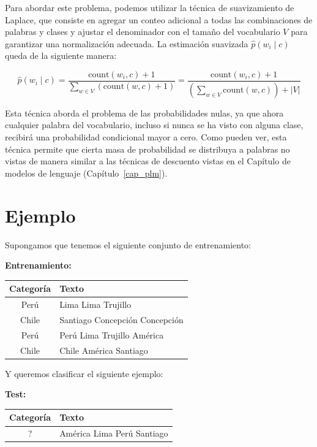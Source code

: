 \documentclass[11pt,fleqn]{book} %
\begin{document}
Para abordar este problema, podemos utilizar la técnica de suavizamiento de Laplace, que consiste en agregar un conteo adicional a todas las combinaciones de palabras y clases y ajustar el denominador con el tamaño del vocabulario $V$ para garantizar una normalización adecuada. La estimación suavizada $\hat{p}(w_i \mid c)$ queda de la siguiente manera:

\[
\hat{p}(w_i \mid c) = \frac{\text{count}(w_i, c) + 1}{\sum_{w \in V} (\text{count}(w, c) + 1)} = \frac{\text{count}(w_i, c) + 1}{(\sum_{w \in V} \text{count}(w, c))+|V|}
\]

Esta técnica aborda el problema de las probabilidades nulas, ya que ahora cualquier palabra del vocabulario, incluso si nunca se ha visto con alguna clase, recibirá una probabilidad condicional mayor a cero. Como pueden ver, esta técnica permite que cierta masa de probabilidad se distribuya a palabras no vistas de manera similar a  las técnicas de descuento vistas en el Capítulo de modelos de lenguaje (Capítulo~\ref{cap_plm}).








\section{Ejemplo}

Supongamos que tenemos el siguiente conjunto de entrenamiento:

\textbf{Entrenamiento:}
\begin{table}[h]
\centering
\begin{tabular}{|c|p{}|}
\hline
\textbf{Categoría} & \textbf{Texto} \\
\hline
Perú & Lima Lima Trujillo \\
\hline
Chile & Santiago Concepción Concepción\\
\hline
Perú & Perú Lima Trujillo América\\
\hline
Chile & Chile América Santiago \\
\hline
\end{tabular}
\end{table}

Y queremos clasificar el siguiente ejemplo:

\textbf{Test:}
\begin{table}[h]
\centering
\begin{tabular}{|c|p{}|}
\hline
\textbf{Categoría} & \textbf{Texto} \\
\hline
? & América Lima Perú Santiago \\
\hline
\end{tabular}
\end{table}
\end{document}
